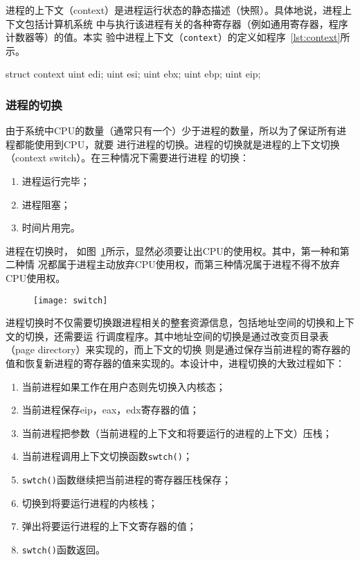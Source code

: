 \documentclass{swfuthesism}
\begin{document}
进程的上下文（context）是进程运行状态的静态描述（快照）。具体地说，进程上下文包括计算机系统
中与执行该进程有关的各种寄存器（例如通用寄存器，程序计数器等）的值\cite{Sibasankar2010}。本实
验中进程上下文（\texttt{context}）的定义如程序~\ref{lst:context}所示。
\begin{listing}%
  \begin{codeblock}[.5]
    \begin{ccode}
struct context {
  uint edi;
  uint esi;
  uint ebx;
  uint ebp;
  uint eip;
}
\end{ccode}
  \end{codeblock}
  \label{lst:context}
\end{listing}

\subsubsection{进程的切换}

由于系统中CPU的数量（通常只有一个）少于进程的数量，所以为了保证所有进程都能使用到CPU，就要
进行进程的切换。进程的切换就是进程的上下文切换（context switch）。在三种情况下需要进行进程
的切换\cite{silberschatz11essentials}：
\begin{enumerate}
\item 进程运行完毕；
\item 进程阻塞；
\item 时间片用完。
\end{enumerate}

进程在切换时， 如图~\ref{fig:switch}所示，显然必须要让出CPU的使用权。其中，第一种和第二种情
况都属于进程主动放弃CPU使用权，而第三种情况属于进程不得不放弃CPU使用权。

\begin{figure}[h]
  \centering
  \texttt{[image: switch]}
  \label{fig:switch}
\end{figure}

进程切换时不仅需要切换跟进程相关的整套资源信息，包括地址空间的切换和上下文的切换，还需要运
行调度程序。其中地址空间的切换是通过改变页目录表（page directory）来实现的，而上下文的切换
则是通过保存当前进程的寄存器的值和恢复新进程的寄存器的值来实现的。本设计中，进程切换的大致过程如下：
\begin{enumerate}
\item 当前进程如果工作在用户态则先切换入内核态；
\item 当前进程保存eip，eax，edx寄存器的值；
\item 当前进程把参数（当前进程的上下文和将要运行的进程的上下文）压栈；
\item 当前进程调用上下文切换函数\texttt{swtch()}；
\item \texttt{swtch()}函数继续把当前进程的寄存器压栈保存；
\item 切换到将要运行进程的内核栈；
\item 弹出将要运行进程的上下文寄存器的值；
\item \texttt{swtch()}函数返回。
\end{enumerate}
\end{document}
